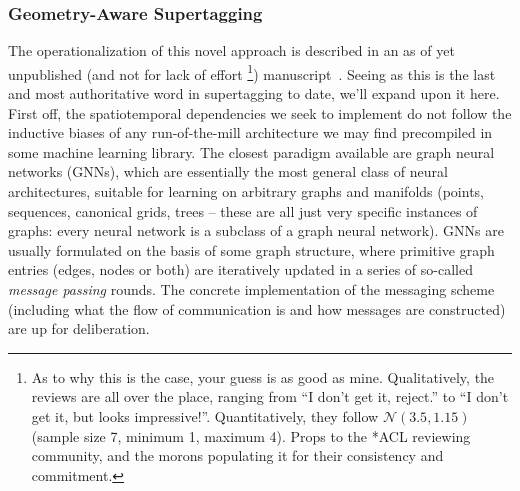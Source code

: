 \subsubsection{Geometry-Aware Supertagging}
The operationalization of this novel approach is described in an as of yet unpublished (and not for lack of effort%
\footnote{As to why this is the case, your guess is as good as mine. Qualitatively, the reviews are all over the place, ranging from ``I don't get it, reject.'' to ``I don't get it, but looks impressive!''. Quantitatively, they follow $\mathcal{N}(3.5, 1.15)$ (sample size 7, minimum 1, maximum 4). Props to the *ACL reviewing community, and the morons populating it for their consistency and commitment.})
manuscript~\cite{kogkalidis2022geometryaware}.
Seeing as this is the last and most authoritative word in supertagging to date, we'll expand upon it here.
First off, the spatiotemporal dependencies we seek to implement do not follow the inductive biases of any run-of-the-mill architecture we may find precompiled in some machine learning library.
The closest paradigm available are graph neural networks (GNNs), which are essentially the most general class of neural architectures, suitable for learning on arbitrary graphs and manifolds (points, sequences, canonical grids, trees -- these are all just very specific instances of graphs: every neural network is a subclass of a graph neural network).
GNNs are usually formulated on the basis of some graph structure, where primitive graph entries (edges, nodes or both) are iteratively updated in a series of so-called \textit{message passing} rounds.
The concrete implementation of the messaging scheme (including what the flow of communication is and how messages are constructed) are up for deliberation.

